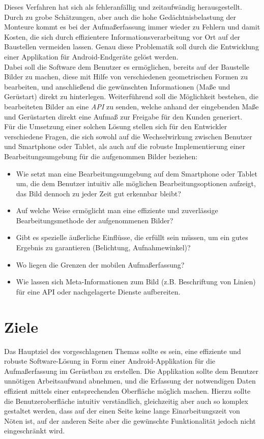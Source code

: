 \documentclass[a4paper]{article}
\begin{document}
Dieses Verfahren hat sich als fehleranfällig und zeitaufwändig herausgestellt.
Durch zu grobe Schätzungen, aber auch die hohe Gedächtnisbelastung der Monteure kommt es bei der Aufmaßerfassung immer wieder zu Fehlern und damit Kosten, die sich durch effizientere Informationsverarbeitung vor Ort auf der Baustellen vermeiden lassen.
Genau diese Problematik soll durch die Entwicklung einer Applikation für Android-Endgeräte gelöst werden. \\

Dabei soll die Software dem Benutzer es ermöglichen, bereits auf der Baustelle Bilder zu machen, diese mit Hilfe von verschiedenen geometrischen Formen zu bearbeiten, und anschließend die gewünschten Informationen (Maße und Gerüstart) direkt zu hinterlegen.
Weiterführend soll die Möglichkeit bestehen, die bearbeiteten Bilder an eine \textit{API} zu senden, welche anhand der eingebenden Maße und Gerüstarten direkt eine Aufmaß zur Freigabe für den Kunden generiert.\\

Für die Umsetzung einer solchen Lösung stellen sich für den Entwickler verschiedene Fragen, die sich sowohl auf die Wechselwirkung zwischen Benutzer und Smartphone oder Tablet, als auch auf die robuste Implementierung einer Bearbeitungsumgebung für die aufgenommen Bilder beziehen: \\

\begin{itemize}
	\item Wie setzt man eine Bearbeitungsumgebung auf dem Smartphone oder Tablet um, die dem Benutzer intuitiv alle möglichen Bearbeitungsoptionen aufzeigt, das Bild dennoch zu jeder Zeit gut erkennbar bleibt?
	\item Auf welche Weise ermöglicht man eine effiziente und zuverlässige Bearbeitungsmethode der aufgenommenen Bilder?
	\item Gibt es spezielle äußerliche Einflüsse, die erfüllt sein müssen, um ein gutes Ergebnis zu garantieren (Belichtung, Aufnahmewinkel)?
	\item Wo liegen die Grenzen der mobilen Aufmaßerfassung?
	\item Wie lassen sich Meta-Informationen zum Bild (z.B. Beschriftung von Linien) für eine API oder nachgelagerte Dienste aufbereiten.
\end{itemize}

\section*{Ziele}
Das Hauptziel des vorgeschlagenen Themas sollte es sein, eine effiziente und robuste Software-Lösung in Form einer Android-Applikation für die Aufmaßerfassung im Gerüstbau zu erstellen. 
Die Applikation sollte dem Benutzer unnötigen Arbeitsaufwand abnehmen, und die Erfassung der notwendigen Daten effizient mittels einer entsprechenden Oberfläche möglich machen.
Hierzu sollte die Benutzeroberfläche intuitiv verständlich, gleichzeitig aber auch so komplex gestaltet werden, dass auf der einen Seite keine lange Einarbeitungszeit von Nöten ist, auf der anderen Seite aber die gewünschte Funktionalität jedoch nicht eingeschränkt wird.
\end{document}

